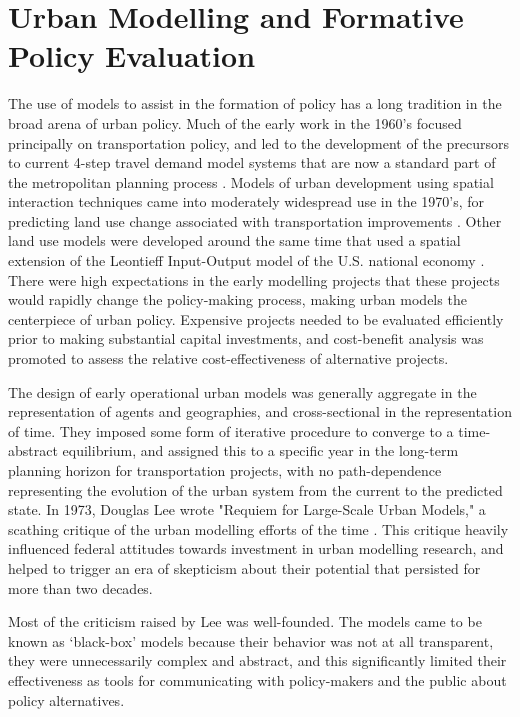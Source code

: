 \documentclass[12pt,a4paper]{article}
\begin{document}
\section{Urban Modelling and Formative Policy Evaluation}
The use of models to assist in the formation of policy has a long
tradition in the broad arena of urban policy.  Much of the early
work in the 1960's focused principally on transportation policy,
and led to the development of the precursors to current 4-step
travel demand model systems that are now a standard part of the
metropolitan planning process \cite{}. Models of urban development
using spatial interaction techniques came into moderately
widespread use in the 1970's, for predicting land use change
associated with transportation improvements
\cite{putman-book-1983}.  Other land use models were developed
around the same time that used a spatial extension of the
Leontieff Input-Output model of the U.S. national economy
\cite{echenique-transport-reviews-1990,delabarra-book-1995}. There
were high expectations in the early modelling projects that these
projects would rapidly change the policy-making process, making
urban models the centerpiece of urban policy.  Expensive projects
needed to be evaluated efficiently prior to making substantial
capital investments, and cost-benefit analysis was promoted to
assess the relative cost-effectiveness of alternative projects.

The design of early operational urban models was generally
aggregate in the representation of agents and geographies, and
cross-sectional in the representation of time.  They imposed some
form of iterative procedure to converge to a time-abstract
equilibrium, and assigned this to a specific year in the long-term
planning horizon for transportation projects, with no
path-dependence representing the evolution of the urban system
from the current to the predicted state.  In 1973, Douglas Lee
wrote "Requiem for Large-Scale Urban Models," a scathing critique
of the urban modelling efforts of the time
\cite{lee-1973,lee-1994}. This critique heavily influenced federal
attitudes towards investment in urban modelling research, and
helped to trigger an era of skepticism about their potential that
persisted for more than two decades.

Most of the criticism raised by Lee was well-founded.  The models
came to be known as `black-box' models because their behavior was
not at all transparent, they were unnecessarily complex and
abstract, and this significantly limited their effectiveness as
tools for communicating with policy-makers and the public about
policy alternatives.
\end{document}
